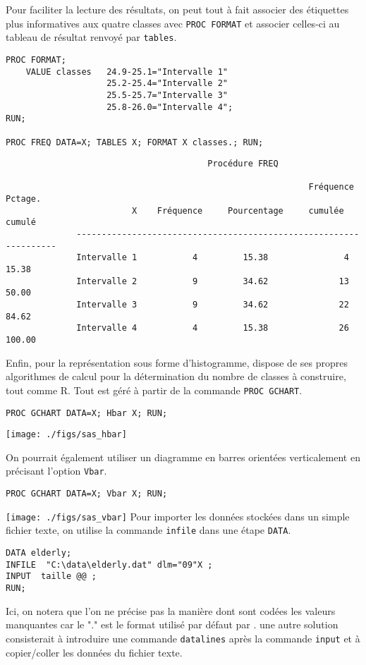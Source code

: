 Pour faciliter la lecture des résultats, on peut tout à fait associer des
étiquettes plus informatives aux quatre classes avec \texttt{PROC FORMAT}
et associer celles-ci au tableau de résultat renvoyé par \texttt{tables}.
\begin{verbatim}
PROC FORMAT;
    VALUE classes   24.9-25.1="Intervalle 1"
                    25.2-25.4="Intervalle 2"
                    25.5-25.7="Intervalle 3"
                    25.8-26.0="Intervalle 4";
RUN;

PROC FREQ DATA=X; TABLES X; FORMAT X classes.; RUN;
\end{verbatim}

\begin{verbatim}
                                        Procédure FREQ

                                                            Fréquence    Pctage.
                         X    Fréquence     Pourcentage     cumulée      cumulé
              ------------------------------------------------------------------
              Intervalle 1           4         15.38               4      15.38
              Intervalle 2           9         34.62              13      50.00
              Intervalle 3           9         34.62              22      84.62
              Intervalle 4           4         15.38              26     100.00
\end{verbatim}

Enfin, pour la représentation sous forme d'histogramme, \SAS dispose de ses
propres algorithmes de calcul pour la détermination du nombre de classes à
construire, tout comme R. Tout est géré à partir de la commande
\texttt{PROC GCHART}.
\begin{verbatim}
PROC GCHART DATA=X; Hbar X; RUN;  
\end{verbatim}

\texttt{[image: ./figs/sas\_hbar]}


On pourrait également utiliser un diagramme en barres orientées
verticalement en précisant l'option \texttt{Vbar}.
\begin{verbatim}
PROC GCHART DATA=X; Vbar X; RUN;
\end{verbatim}

\texttt{[image: ./figs/sas\_vbar]}
%
%
%
\soln{\ref{exo:8.5}}
Pour importer les données stockées dans un simple fichier texte, on utilise
la commande \verb|infile| dans une étape \texttt{DATA}.
\begin{verbatim}
DATA elderly;
INFILE  "C:\data\elderly.dat" dlm="09"X ;
INPUT  taille @@ ;
RUN;
\end{verbatim}
Ici, on notera que l'on ne précise pas la manière dont sont codées les
valeurs manquantes car le "." est le format utilisé par défaut par \SAS. une
autre solution consisterait à introduire une commande \texttt{datalines}
après la commande \texttt{input} et à copier/coller les données du fichier
texte. 

